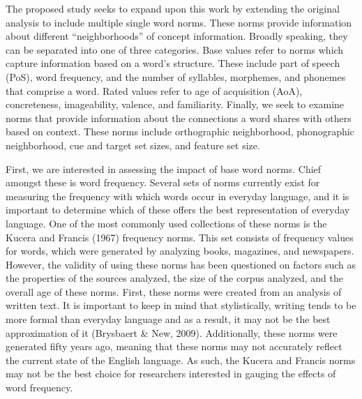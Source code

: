 \documentclass[english,man]{apa6}
\theoremstyle{definition}
\theoremstyle{definition}
\theoremstyle{remark}
\begin{document}
The proposed study seeks to expand upon this work by extending the
original analysis to include multiple single word norms. These norms
provide information about different \enquote{neighborhoods} of concept
information. Broadly speaking, they can be separated into one of three
categories. Base values refer to norms which capture information based
on a word's structure. These include part of speech (PoS), word
frequency, and the number of syllables, morphemes, and phonemes that
comprise a word. Rated values refer to age of acquisition (AoA),
concreteness, imageability, valence, and familiarity. Finally, we seek
to examine norms that provide information about the connections a word
shares with others based on context. These norms include orthographic
neighborhood, phonographic neighborhood, cue and target set sizes, and
feature set size.

First, we are interested in assessing the impact of base word norms.
Chief amongst these is word frequency. Several sets of norms currently
exist for measuring the frequency with which words occur in everyday
language, and it is important to determine which of these offers the
best representation of everyday language. One of the most commonly used
collections of these norms is the Kucera and Francis (1967) frequency
norms. This set consists of frequency values for words, which were
generated by analyzing books, magazines, and newspapers. However, the
validity of using these norms has been questioned on factors such as the
properties of the sources analyzed, the size of the corpus analyzed, and
the overall age of these norms. First, these norms were created from an
analysis of written text. It is important to keep in mind that
stylistically, writing tends to be more formal than everyday language
and as a result, it may not be the best approximation of it (Brysbaert
\& New, 2009). Additionally, these norms were generated fifty years ago,
meaning that these norms may not accurately reflect the current state of
the English language. As such, the Kucera and Francis norms may not be
the best choice for researchers interested in gauging the effects of
word frequency.
\end{document}
